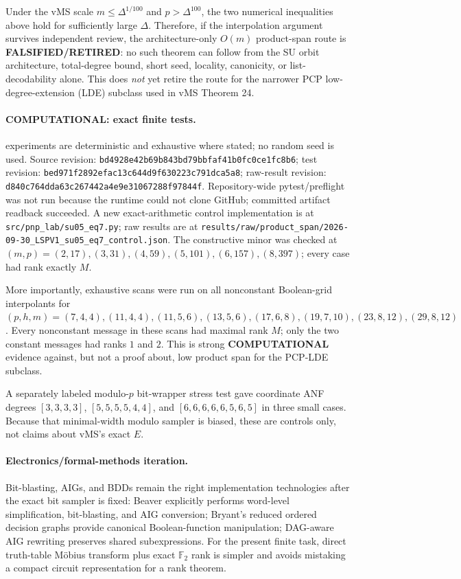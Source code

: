 \documentclass[11pt]{article}
\begin{document}
Under the vMS scale $m\le\Delta^{1/100}$ and $p>\Delta^{100}$, the two numerical inequalities above hold for sufficiently large $\Delta$. Therefore, if the interpolation argument survives independent review, the architecture-only $O(m)$ product-span route is \textbf{FALSIFIED/RETIRED}: no such theorem can follow from the SU orbit architecture, total-degree bound, short seed, locality, canonicity, or list-decodability alone. This does \emph{not} yet retire the route for the narrower PCP low-degree-extension (LDE) subclass used in vMS Theorem 24.

\paragraph{COMPUTATIONAL: exact finite tests.}\nThe experiments are deterministic and exhaustive where stated; no random seed is used. Source revision: \texttt{bd4928e42b69b843bd79bbfaf41b0fc0ce1fc8b6}; test revision: \texttt{bed971f2892efac13c644d9f630223c791dca5a8}; raw-result revision: \texttt{d840c764dda63c267442a4e9e31067288f97844f}. Repository-wide pytest/preflight was not run because the runtime could not clone GitHub; committed artifact readback succeeded.
A new exact-arithmetic control implementation is at
\texttt{src/pnp\_lab/su05\_eq7.py}; raw results are at
\texttt{results/raw/product\_span/2026-09-30\_LSPV1\_su05\_eq7\_control.json}.
The constructive minor was checked at
$(m,p)=(2,17),(3,31),(4,59),(5,101),(6,157),(8,397)$; every case had rank exactly $M$.

More importantly, exhaustive scans were run on all nonconstant Boolean-grid interpolants for
$(p,h,m)=(7,4,4),(11,4,4),(11,5,6),(13,5,6),(17,6,8),(19,7,10),(23,8,12),(29,8,12)$.
Every nonconstant message in these scans had maximal rank $M$; only the two constant messages had ranks $1$ and $2$. This is strong \textbf{COMPUTATIONAL} evidence against, but not a proof about, low product span for the PCP-LDE subclass.

A separately labeled modulo-$p$ bit-wrapper stress test gave coordinate ANF degrees
$[3,3,3,3]$, $[5,5,5,5,4,4]$, and $[6,6,6,6,6,5,6,5]$ in three small cases. Because that minimal-width modulo sampler is biased, these are controls only, not claims about vMS's exact $E$.

\paragraph{Electronics/formal-methods iteration.}
Bit-blasting, AIGs, and BDDs remain the right implementation technologies after the exact bit sampler is fixed: Beaver explicitly performs word-level simplification, bit-blasting, and AIG conversion; Bryant's reduced ordered decision graphs provide canonical Boolean-function manipulation; DAG-aware AIG rewriting preserves shared subexpressions. For the present finite task, direct truth-table M\"obius transform plus exact $\mathbb F_2$ rank is simpler and avoids mistaking a compact circuit representation for a rank theorem.
\end{document}

